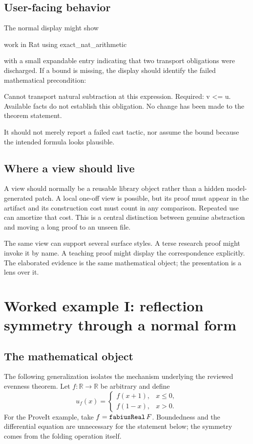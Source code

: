 \documentclass[11pt,a4paper]{article}
\newcommand{\code}[1]{\texttt{\detokenize{#1}}}
\newcommand{\R}{\mathbb R}
\theoremstyle{remark}
\begin{document}
\subsection{User-facing behavior}

The normal display might show
\begin{Code}
work in Rat using exact_nat_arithmetic
\end{Code}
with a small expandable entry indicating that two transport obligations were discharged. If a bound is missing, the display should identify the failed mathematical precondition:
\begin{Code}
Cannot transport natural subtraction at this expression.
Required: v <= u.
Available facts do not establish this obligation.
No change has been made to the theorem statement.
\end{Code}
It should not merely report a failed cast tactic, nor assume the bound because the intended formula looks plausible.

\subsection{Where a view should live}

A view should normally be a reusable library object rather than a hidden model-generated patch. A local one-off view is possible, but its proof must appear in the artifact and its construction cost must count in any comparison. Repeated use can amortize that cost. This is a central distinction between genuine abstraction and moving a long proof to an unseen file.

The same view can support several surface styles. A terse research proof might invoke it by name. A teaching proof might display the correspondence explicitly. The elaborated evidence is the same mathematical object; the presentation is a lens over it.

\section{Worked example I: reflection symmetry through a normal form}\label{sec:even}

\subsection{The mathematical object}

The following generalization isolates the mechanism underlying the reviewed evenness theorem. Let \(f:\R\to\R\) be arbitrary and define
\[
 u_f(x)=
 \begin{cases}
 f(x+1),&x\le0,\\
 f(1-x),&x>0.
 \end{cases}
\]
For the ProveIt example, take \(f=\code{fabiusReal}\,F\). Boundedness and the differential equation are unnecessary for the statement below; the symmetry comes from the folding operation itself.
\end{document}
